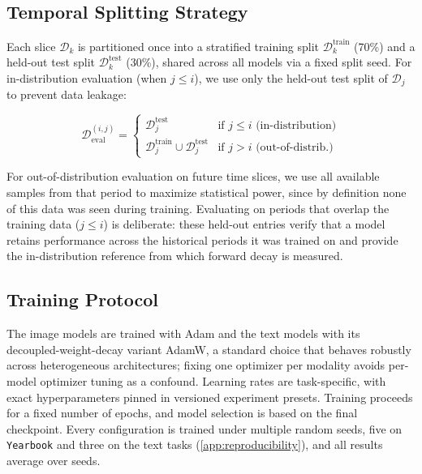 \subsection{Temporal Splitting Strategy}

Each slice $\mathcal{D}_k$ is partitioned once into a stratified training split $\mathcal{D}_k^{\text{train}}$ (70\%) and a held-out test split $\mathcal{D}_k^{\text{test}}$ (30\%), shared across all models via a fixed split seed. For in-distribution evaluation (when $j \leq i$), we use only the held-out test split of $\mathcal{D}_j$ to prevent data leakage:

\begin{equation}
    \nonumber
    \mathcal{D}_{\text{eval}}^{(i,j)} =
    \begin{cases}
        \mathcal{D}_{j}^{\text{test}} & \text{if } j \leq i \text{ (in-distribution)} \\
        \mathcal{D}_{j}^{\text{train}} \cup \mathcal{D}_{j}^{\text{test}} & \text{if } j > i \text{ (out-of-distrib.)}
    \end{cases}
\end{equation}

For out-of-distribution evaluation on future time slices, we use all available samples from that period to maximize statistical power, since by definition none of this data was seen during training. Evaluating on periods that overlap the training data ($j \leq i$) is deliberate: these held-out entries verify that a model retains performance across the historical periods it was trained on and provide the in-distribution reference from which forward decay is measured.

\subsection{Training Protocol}

The image models are trained with Adam \cite{kingma2015adam} and the text models with its decoupled-weight-decay variant AdamW, a standard choice that behaves robustly across heterogeneous architectures; fixing one optimizer per modality avoids per-model optimizer tuning as a confound. Learning rates are task-specific, with exact hyperparameters pinned in versioned experiment presets. Training proceeds for a fixed number of epochs, and model selection is based on the final checkpoint. Every configuration is trained under multiple random seeds, five on \texttt{Yearbook} and three on the text tasks (\cref{app:reproducibility}), and all results average over seeds.

